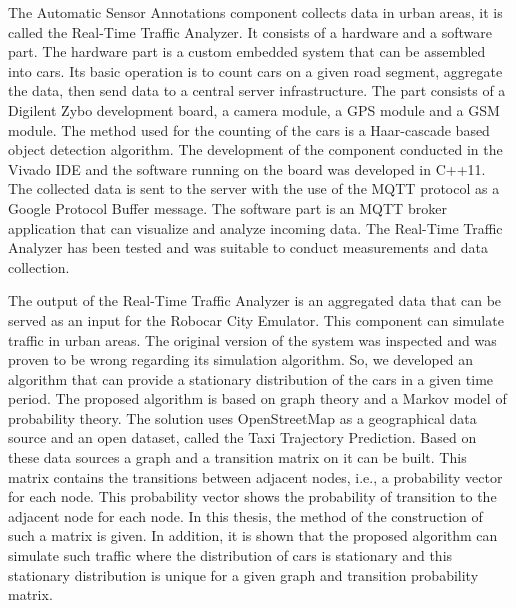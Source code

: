 \documentclass[b5paper,12pt]{report}
\theoremstyle{definition}
\begin{document}
The Automatic Sensor Annotations component collects data in urban areas, it is called the Real-Time Traffic Analyzer. It consists of a hardware and a software part. The hardware part is a custom embedded system that can be assembled into cars. Its basic operation is to count cars on a given road segment, aggregate the data, then send data to a central server infrastructure. The part consists of a Digilent Zybo development board, a camera module, a GPS module and a GSM module. The method used for the counting of the cars is a Haar-cascade based object detection algorithm. The development of the component conducted in the Vivado IDE and the software running on the board was developed in C++11. The collected data is sent to the server with the use of the MQTT protocol as a Google Protocol Buffer message. The software part is an MQTT broker application that can visualize and analyze incoming data. The Real-Time Traffic Analyzer has been tested and was suitable to conduct measurements and data collection.

The output of the Real-Time Traffic Analyzer is an aggregated data that can be served as an input for the Robocar City Emulator. This component can simulate traffic in urban areas. The original version of the system was inspected and was proven to be wrong regarding its simulation algorithm. So, we developed an algorithm that can provide a stationary distribution of the cars in a given time period. The proposed algorithm is based on graph theory and a Markov model of probability theory. The solution uses OpenStreetMap as a geographical data source and an open dataset, called the Taxi Trajectory Prediction. Based on these data sources a graph and a transition matrix on it can be built. This matrix contains the transitions between adjacent nodes, i.e., a probability vector for each node. This probability vector shows the probability of transition to the adjacent node for each node. In this thesis, the method of the construction of such a matrix is given. In addition, it is shown that the proposed algorithm can simulate such traffic where the distribution of cars is stationary and this stationary distribution is unique for a given graph and transition probability matrix.

\newpage
\end{document}
